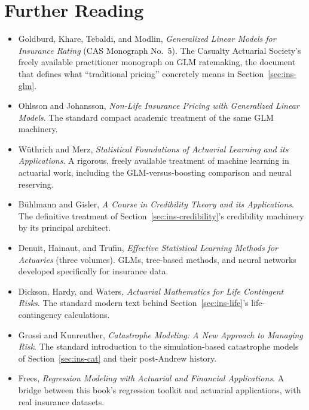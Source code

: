 \documentclass[../ai_in_finance]{subfiles}
\begin{document}
\section{Further Reading}

\begin{itemize}
\item Goldburd, Khare, Tebaldi, and Modlin, \emph{Generalized Linear Models for Insurance Rating} (CAS Monograph No.~5). The Casualty Actuarial Society's freely available practitioner monograph on GLM ratemaking, the document that defines what ``traditional pricing'' concretely means in Section~\ref{sec:ins-glm}.
\item Ohlsson and Johansson, \emph{Non-Life Insurance Pricing with Generalized Linear Models}. The standard compact academic treatment of the same GLM machinery.
\item W\"uthrich and Merz, \emph{Statistical Foundations of Actuarial Learning and its Applications}. A rigorous, freely available treatment of machine learning in actuarial work, including the GLM-versus-boosting comparison and neural reserving.
\item B\"uhlmann and Gisler, \emph{A Course in Credibility Theory and its Applications}. The definitive treatment of Section~\ref{sec:ins-credibility}'s credibility machinery by its principal architect.
\item Denuit, Hainaut, and Trufin, \emph{Effective Statistical Learning Methods for Actuaries} (three volumes). GLMs, tree-based methods, and neural networks developed specifically for insurance data.
\item Dickson, Hardy, and Waters, \emph{Actuarial Mathematics for Life Contingent Risks}. The standard modern text behind Section~\ref{sec:ins-life}'s life-contingency calculations.
\item Grossi and Kunreuther, \emph{Catastrophe Modeling: A New Approach to Managing Risk}. The standard introduction to the simulation-based catastrophe models of Section~\ref{sec:ins-cat} and their post-Andrew history.
\item Frees, \emph{Regression Modeling with Actuarial and Financial Applications}. A bridge between this book's regression toolkit and actuarial applications, with real insurance datasets.
\end{itemize}
\end{document}
